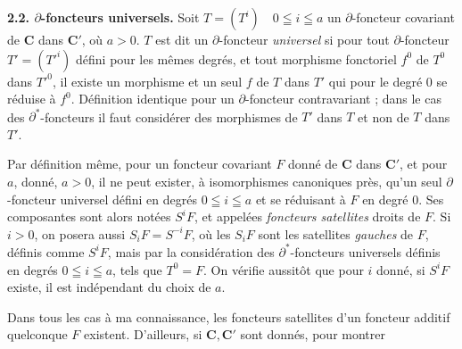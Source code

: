 \indent\textbf{2.2. $\partial$-foncteurs universels.}
Soit $T=(T^i)\quad 0\leqq i\leqq a$ un $\partial$-foncteur covariant de $\mathbf{C}$ dans
$\mathbf{C}'$, où $a>0$. $T$ est dit un $\partial$-foncteur \textit{universel} si pour
tout $\partial$-foncteur $T'=(T'^i)$ défini pour les mêmes degrés, et tout
morphisme fonctoriel $f^0$ de $T^0$ dans $T'^0$, il existe un
morphisme et un seul $f$ de $T$ dans $T'$ qui pour le degré $0$ se réduise à
$f^0$. Définition identique pour un $\partial$-foncteur contravariant ;
dans le cas des $\partial^*$-foncteurs il faut considérer des morphismes de
$T'$ dans $T$ et non de $T$ dans $T'$.

Par définition même, pour un foncteur covariant $F$ donné de $\mathbf{C}$ dans $\mathbf{C}'$, et
pour $a$, donné, $a>0$, il ne peut exister, à isomorphismes canoniques près,
qu'un seul $\partial$-foncteur universel défini en degrés $0\leqq i\leqq a$ et
se réduisant à $F$ en degré 0.
Ses composantes sont alors notées $S^iF$, et appelées \textit{foncteurs
satellites} droits de $F$. Si $i>0$, on posera aussi $S_iF=S^{-i}F$, où les
$S_iF$ sont les satellites \textit{gauches} de $F$, définis comme $S^iF$,
mais par la considération des $\partial^*$-foncteurs universels définis en
degrés $0\leqq i\leqq a$, tels que $T^0=F$. On vérifie aussitôt que pour $i$
donné, si $S^iF$ existe, il est indépendant du choix de $a$.

Dans tous les cas à ma connaissance, les foncteurs satellites d'un foncteur
additif quelconque $F$ existent. D'ailleurs, si $\mathbf{C},\mathbf{C}'$ sont donnés, pour
montrer

